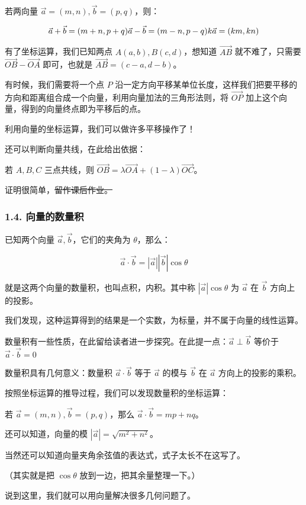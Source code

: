 若两向量 $\vec a=(m,n),\vec b=(p,q)$，则：

$$
\vec a+\vec b=(m+n,p+q)\\
\vec a-\vec b=(m-n,p-q)\\
k\vec a=(km,kn)
$$

有了坐标运算，我们已知两点 $A(a,b),B(c,d)$，想知道 $\vec{AB}$ 就不难了，只需要 $\vec{OB}-\vec{OA}$ 即可，也就是 $\vec{AB}=(c-a,d-b)$。

有时候，我们需要将一个点 $P$ 沿一定方向平移某单位长度，这样我们把要平移的方向和距离组合成一个向量，利用向量加法的三角形法则，将 $\vec{OP}$ 加上这个向量，得到的向量终点即为平移后的点。

利用向量的坐标运算，我们可以做许多平移操作了！

还可以判断向量共线，在此给出依据：

若 $A,B,C$ 三点共线，则 $\vec{OB}=\lambda \vec{OA}+(1-\lambda)\vec{OC}$。

证明很简单，\st{留作课后作业。}

\subsubsection{1.4. 向量的数量积}

已知两个向量 $\vec a,\vec b$，它们的夹角为 $\theta$，那么：

$$
\vec a \cdot \vec b=|\vec a||\vec b|\cos \theta
$$

就是这两个向量的数量积，也叫点积，内积。其中称 $|\vec a|\cos \theta$ 为 $\vec a$ 在 $\vec b$ 方向上的投影。

我们发现，这种运算得到的结果是一个实数，为标量，并不属于向量的线性运算。

数量积有一些性质，在此留给读者进一步探究。在此提一点：$\vec a \perp \vec b$ 等价于 $\vec a\cdot \vec b=0$

数量积具有几何意义：数量积 $\vec a \cdot \vec b$ 等于 $\vec a$ 的模与 $\vec b$ 在 $\vec a$ 方向上的投影的乘积。

按照坐标运算的推导过程，我们可以发现数量积的坐标运算：

若 $\vec a=(m,n),\vec b=(p,q)$，那么 $\vec a\cdot \vec b=mp+nq$。

还可以知道，向量的模 $|\vec a|=\sqrt {m^2+n^2}$。

当然还可以知道向量夹角余弦值的表达式，式子太长不在这写了。

（其实就是把 $\cos \theta$ 放到一边，把其余量整理一下。）

说到这里，我们就可以用向量解决很多几何问题了。

